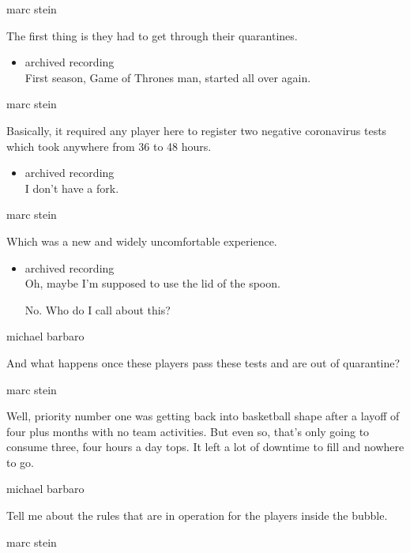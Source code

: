 marc stein

The first thing is they had to get through their quarantines.

\begin{itemize}
\tightlist
\item
  archived recording\\
  First season, Game of Thrones man, started all over again.
\end{itemize}

marc stein

Basically, it required any player here to register two negative
coronavirus tests which took anywhere from 36 to 48 hours.

\begin{itemize}
\tightlist
\item
  archived recording\\
  I don't have a fork.
\end{itemize}

marc stein

Which was a new and widely uncomfortable experience.

\begin{itemize}
\item
  archived recording\\
  Oh, maybe I'm supposed to use the lid of the spoon.

  No. Who do I call about this?
\end{itemize}

michael barbaro

And what happens once these players pass these tests and are out of
quarantine?

marc stein

Well, priority number one was getting back into basketball shape after a
layoff of four plus months with no team activities. But even so, that's
only going to consume three, four hours a day tops. It left a lot of
downtime to fill and nowhere to go.

michael barbaro

Tell me about the rules that are in operation for the players inside the
bubble.

marc stein

